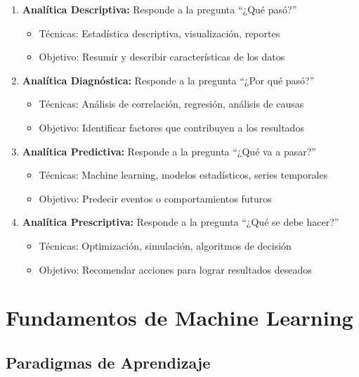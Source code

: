 \begin{enumerate}
    \item \textbf{Analítica Descriptiva:} Responde a la pregunta ``¿Qué pasó?''
        \begin{itemize}
            \item Técnicas: Estadística descriptiva, visualización, reportes
            \item Objetivo: Resumir y describir características de los datos
        \end{itemize}
    
    \item \textbf{Analítica Diagnóstica:} Responde a la pregunta ``¿Por qué pasó?''
        \begin{itemize}
            \item Técnicas: Análisis de correlación, regresión, análisis de causas
            \item Objetivo: Identificar factores que contribuyen a los resultados
        \end{itemize}
    
    \item \textbf{Analítica Predictiva:} Responde a la pregunta ``¿Qué va a pasar?''
        \begin{itemize}
            \item Técnicas: Machine learning, modelos estadísticos, series temporales
            \item Objetivo: Predecir eventos o comportamientos futuros
        \end{itemize}
    
    \item \textbf{Analítica Prescriptiva:} Responde a la pregunta ``¿Qué se debe hacer?''
        \begin{itemize}
            \item Técnicas: Optimización, simulación, algoritmos de decisión
            \item Objetivo: Recomendar acciones para lograr resultados deseados
        \end{itemize}
\end{enumerate}

\section{Fundamentos de Machine Learning}

\subsection{Paradigmas de Aprendizaje}

